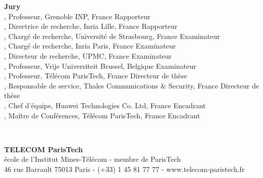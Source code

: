 \vfill

\begin{minipage}{.9\textwidth}	%
  \textbf{Jury}\\


\textbf{\Duda}, {\small Professeur, Grenoble INP, France}
	\hfill Rapporteur\\
\textbf{\Nathalie}, {\small Directrice de recherche, Inria Lille, France}
	\hfill Rapporteur\\
\textbf{\Fabrice}, {\small Chargé de recherche, Université de Strasbourg, France}
	\hfill Examinateur\\
\textbf{\Thomas}, {\small Chargé de recherche, Inria Paris, France}
	\hfill Examinateur\\
\textbf{\Marcelo}, {\small Directeur de recherche, UPMC, France}
	\hfill Examinateur\\
\textbf{\Jacques}, {\small Professeur, Vrije Universiteit Brussel, Belgique}
	\hfill Examinateur\\
\textbf{\JeanLouis}, {\small Professeur, Télécom ParisTech, France}
	\hfill Directeur de thèse\\
\textbf{\Vania}, {\small Responsable de service, Thales Communications \& Security, France}
	\hfill Directeur de thèse\\
\textbf{\Jeremie}, {\small Chef d'équipe, Huawei Technologies Co. Ltd, France}
	\hfill Encadrant\\
\textbf{\Claude}, {\small Maître de Conférences, Télécom ParisTech, France}
	\hfill Encadrant\\


\end{minipage}\\

\vspace{-.3cm}

\begin{center}
	
\textbf{TELECOM ParisTech}\\
{\small école de l'Institut Mines-Télécom - membre de ParisTech}\\
{\tiny 46 rue Barrault 75013 Paris - (+33) 1 45 81 77 77 - www.telecom-paristech.fr}
\end{center}


\restoregeometry
